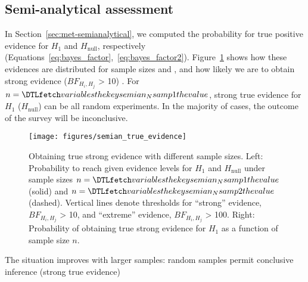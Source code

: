 \documentclass[twocolumn,twocolappendix,linenumbers]{aastex631}
\begin{document}

\subsection{Semi-analytical assessment}\label{sec:results-semianalytical}
In Section~\ref{sec:met-semianalytical}, we computed the probability for true positive evidence for $H_\mathrm{1}$ and $H_\mathrm{null}$, respectively (Equations~\ref{eq:bayes_factor},~\ref{eq:bayes_factor2}).
Figure~\ref{fig:semian_true_evidence} shows how these evidences are distributed for sample sizes  and , and how likely we are to obtain strong evidence ($BF_{H_i, H_j}$ > 10) .
For $n = \var{semian_Nsamp1}$, strong true evidence for $H_\mathrm{1}$ ($H_\mathrm{null}$) can be  all random experiments.
In the majority of cases, the outcome of the survey will be inconclusive.
\begin{figure*}
    \begin{centering}
        \texttt{[image: figures/semian\_true\_evidence]}
        \caption{Obtaining true strong evidence with different sample sizes. Left: Probability to reach given evidence levels for $H_\mathrm{1}$ and $H_\mathrm{null}$ under sample sizes $n = \var{semian_Nsamp1}$ (solid) and $n = \var{semian_Nsamp2}$ (dashed). Vertical lines denote thresholds for ``strong'' evidence, $BF_{H_i, H_j}$ > 10, and ``extreme'' evidence, $BF_{H_i, H_j}$ > 100. Right: Probability of obtaining true strong evidence for $H_\mathrm{1}$ as a function of sample size $n$.}
        \label{fig:semian_true_evidence}
    \end{centering}
\end{figure*}
The situation improves with larger samples:  random samples permit conclusive inference (strong true evidence) 
\end{document}
